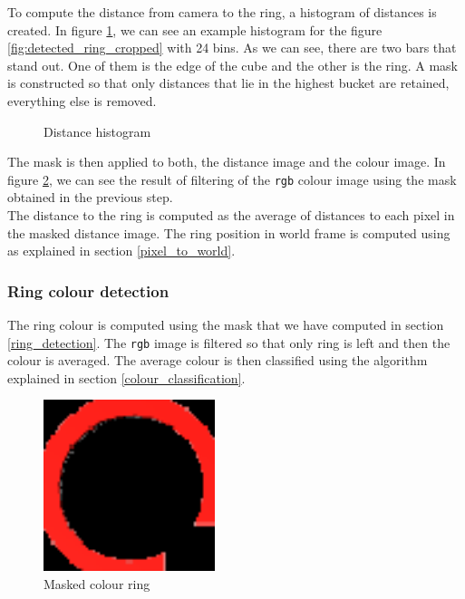 \documentclass[12pt,a4paper]{article}
\begin{document}
	To compute the distance from camera to the ring, a histogram of distances is created. In figure \ref{fig:distance_histogram}, we can see an example histogram for the figure \ref{fig:detected_ring_cropped} with 24 bins. As we can see, there are two bars that stand out. One of them is the edge of the cube and the other is the ring. A mask is constructed so that only distances that lie in the highest bucket are retained, everything else is removed. \\
	
	\begin{figure}[H]
		\centering
		\caption{Distance histogram}
		\label{fig:distance_histogram}
	\end{figure}

	The mask is then applied to both, the distance image and the colour image. In figure \ref{fig:masked_colour_ring}, we can see the result of filtering of the \texttt{rgb} colour image using the mask obtained in the previous step. \\

	The distance to the ring is computed as the average of distances to each pixel in the masked distance image. The ring position in world frame is computed using as explained in section \ref{pixel_to_world}. \\

	\subsubsection{Ring colour detection}
	The ring colour is computed using the mask that we have computed in section \ref{ring_detection}. The \texttt{rgb} image is filtered so that only ring is left and then the colour is averaged. The average colour is then classified using the algorithm explained in section \ref{colour_classification}.
	
	\begin{figure}[h]
		\centering
		\includegraphics[height=5cm]{images/ring_detection_colour}
		\caption{Masked colour ring}
		\label{fig:masked_colour_ring}
	\end{figure}
		
\end{document}
